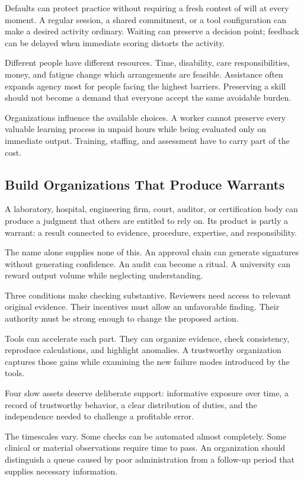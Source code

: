 Defaults can protect practice without requiring a fresh contest of will at every moment. A regular session, a shared commitment, or a tool configuration can make a desired activity ordinary. Waiting can preserve a decision point; feedback can be delayed when immediate scoring distorts the activity.

Different people have different resources. Time, disability, care responsibilities, money, and fatigue change which arrangements are feasible. Assistance often expands agency most for people facing the highest barriers. Preserving a skill should not become a demand that everyone accept the same avoidable burden.

Organizations influence the available choices. A worker cannot preserve every valuable learning process in unpaid hours while being evaluated only on immediate output. Training, staffing, and assessment have to carry part of the cost.

\subsection{Build Organizations That Produce Warrants}

A laboratory, hospital, engineering firm, court, auditor, or certification body can produce a judgment that others are entitled to rely on. Its product is partly a warrant: a result connected to evidence, procedure, expertise, and responsibility.

The name alone supplies none of this. An approval chain can generate signatures without generating confidence. An audit can become a ritual. A university can reward output volume while neglecting understanding.

Three conditions make checking substantive. Reviewers need access to relevant original evidence. Their incentives must allow an unfavorable finding. Their authority must be strong enough to change the proposed action.

Tools can accelerate each part. They can organize evidence, check consistency, reproduce calculations, and highlight anomalies. A trustworthy organization captures those gains while examining the new failure modes introduced by the tools.

Four slow assets deserve deliberate support: informative exposure over time, a record of trustworthy behavior, a clear distribution of duties, and the independence needed to challenge a profitable error.

The timescales vary. Some checks can be automated almost completely. Some clinical or material observations require time to pass. An organization should distinguish a queue caused by poor administration from a follow-up period that supplies necessary information.

